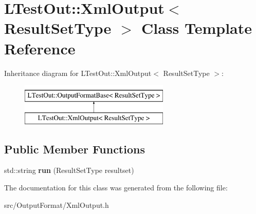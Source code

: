 \hypertarget{class_l_test_out_1_1_xml_output}{\section{L\-Test\-Out\-:\-:Xml\-Output$<$ Result\-Set\-Type $>$ Class Template Reference}
\label{class_l_test_out_1_1_xml_output}
}
Inheritance diagram for L\-Test\-Out\-:\-:Xml\-Output$<$ Result\-Set\-Type $>$\-:\begin{figure}[H]
\begin{center}
\leavevmode
\includegraphics[height=2.000000cm]{class_l_test_out_1_1_xml_output}
\end{center}
\end{figure}
\subsection*{Public Member Functions}
\begin{DoxyCompactItemize}
\item 
\hypertarget{class_l_test_out_1_1_xml_output_ab95102301c6d41197db51c86923d5268}{std\-::string {\bfseries run} (Result\-Set\-Type resultset)}\label{class_l_test_out_1_1_xml_output_ab95102301c6d41197db51c86923d5268}

\end{DoxyCompactItemize}


The documentation for this class was generated from the following file\-:\begin{DoxyCompactItemize}
\item 
src/\-Output\-Format/Xml\-Output.\-h\end{DoxyCompactItemize}
